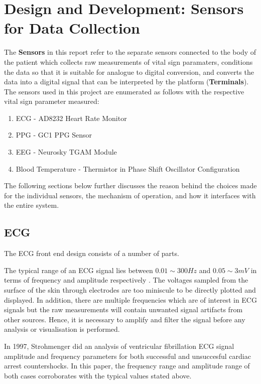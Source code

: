 \chapter{Design and Development: Sensors for Data Collection} 
\label{sensors}

The {\bf Sensors} in this report refer to the separate sensors connected to the body of the patient which collects raw measurements of vital sign paramaters, conditions the data so that it is suitable for analogue to digital conversion, and converts the data into a digital signal that can be interpreted by the platform ({\bf Terminals}). \\

The sensors used in this project are enumerated as follows with the respective vital sign parameter measured: 

\begin{enumerate}
	\item ECG - AD8232 Heart Rate Monitor 
	\item PPG - GC1 PPG Sensor
	\item EEG - Neurosky TGAM Module
	\item Blood Temperature - Thermistor in Phase Shift Oscillator Configuration
\end{enumerate}

The following sections below further discusses the reason behind the choices made for the individual sensors, the mechanism of operation, and how it interfaces with the entire system. 

\section{ECG}
\label{ecgdevices}

The ECG front end design consists of a number of parts. 

The typical range of an ECG signal lies between $0.01\sim 300Hz$ and $0.05\sim 3mV$ in terms of frequency and amplitude respectively \cite{nisignalamplitude}. The voltages sampled from the surface of the skin through electrodes are too miniscule to be directly plotted and displayed. In addition, there are multiple frequencies which are of interest in ECG signals but the raw measurements will contain unwanted signal artifacts from other sources. Hence, it is necessary to amplify and filter the signal before any analysis or visualisation is performed.  

In 1997, Strohmenger \cite{strohmenger1997analysis} did an analysis of ventricular fibrillation ECG signal amplitude and frequency parameters for both successful and unsuccesful cardiac arrest countershocks. In this paper, the frequency range and amplitude range of both cases corroborates with the typical values stated above.  



